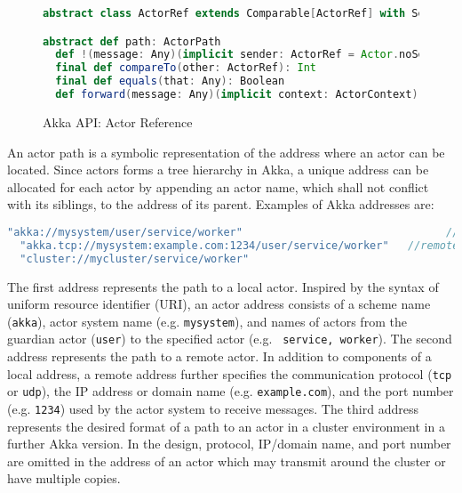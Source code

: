 \begin{figure}[h]
\begin{lstlisting}[language=scala]
abstract class ActorRef extends Comparable[ActorRef] with Serializable

abstract def path: ActorPath
  def !(message: Any)(implicit sender: ActorRef = Actor.noSender): Unit
  final def compareTo(other: ActorRef): Int
  final def equals(that: Any): Boolean
  def forward(message: Any)(implicit context: ActorContext): Unit

\end{lstlisting}
\caption{Akka API: Actor Reference}
\label{akka_actor_reference_api}
\end{figure}


An actor path is a symbolic representation of the address where an actor can be 
located.  Since actors forms a tree hierarchy in Akka, a unique address can be 
allocated for each actor by appending an actor name, which shall not conflict 
with its siblings, to the address of its parent.   Examples of Akka addresses 
are:

\newpage
\begin{lstlisting}[language=scala]
  "akka://mysystem/user/service/worker"                                //local
  "akka.tcp://mysystem:example.com:1234/user/service/worker"   //remote
  "cluster://mycluster/service/worker"                                 //cluster
\end{lstlisting}

The first address represents the path to a local actor.  Inspired by the syntax 
of uniform resource identifier (URI), an actor address consists of a 
scheme name ({\tt akka}), actor system name (e.g. {\tt mysystem}), and names of 
actors from the guardian actor ({\tt user}) to the specified actor (e.g. {\tt 
service, worker}).  The second address represents the path to a remote actor.  
In addition to components of a local address, a remote address further 
specifies the communication protocol ({\tt tcp} or {\tt udp}), the IP address 
or domain name (e.g. {\tt example.com}), and the port number (e.g. {\tt 1234}) 
used by the actor system to receive messages. The third address represents the 
desired format of a path to an actor in a cluster environment in a further Akka 
version.  In the design,  protocol, IP/domain name, and port number are omitted 
in the address of an actor which may transmit around the cluster or have 
multiple copies.

